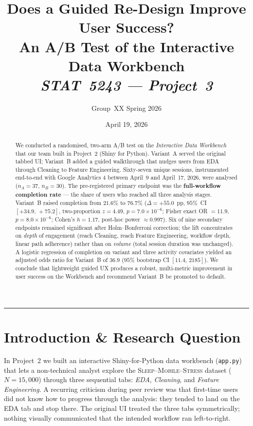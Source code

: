 \documentclass[11pt,a4paper]{article}
\title{\vspace{-1.5em}\textbf{Does a Guided Re-Design Improve User Success?}\\
       \large An A/B Test of the Interactive Data Workbench\\[2pt]
       \normalsize \textit{STAT~5243 — Project~3}}
\author{Group~XX \quad\textbar\quad Spring 2026}
\date{April 19, 2026}
\newcommand{\hr}{\noindent\textcolor{accent!30}{\rule{\linewidth}{0.4pt}}\smallskip}
\begin{document}
\maketitle
\vspace{-2em}

\begin{abstract}\noindent
\small
We conducted a randomised, two-arm A/B test on the
\emph{Interactive Data Workbench} that our team built in Project~2
(Shiny for Python). Variant~A served the original tabbed UI;
Variant~B added a guided walkthrough that nudges users from EDA
through Cleaning to Feature Engineering. Sixty-seven unique
sessions, instrumented end-to-end with Google Analytics 4 between
April~9 and April~17, 2026, were analysed
($n_A=37$, $n_B=30$). The pre-registered primary endpoint was the
\textbf{full-workflow completion rate} — the share of users who
reached all three analysis stages. Variant~B raised completion
from $21.6\%$ to $76.7\%$ ($\Delta = +55.0$~pp,
$95\%$~CI~$[+34.9,\,+75.2]$, two-proportion $z = 4.49$,
$p = 7.0\times10^{-6}$; Fisher exact OR $= 11.9$, $p = 8.0\times10^{-6}$;
Cohen's $h = 1.17$, post-hoc power $\approx 0.997$). Six of nine
secondary endpoints remained significant after Holm--Bonferroni
correction; the lift concentrates on \emph{depth} of engagement
(reach Cleaning, reach Feature Engineering, workflow depth, linear
path adherence) rather than on \emph{volume} (total session
duration was unchanged). A logistic regression of completion on
variant and three activity covariates yielded an adjusted odds
ratio for Variant~B of $36.9$ ($95\%$ bootstrap CI
$[11.4,\,2185]$). We conclude that lightweight guided UX produces a
robust, multi-metric improvement in user success on the Workbench
and recommend Variant~B be promoted to default.
\end{abstract}

\vspace{-0.4em}
\hr

\section{Introduction \& Research Question}

In Project~2 we built an interactive Shiny-for-Python data
workbench (\texttt{app.py}) that lets a non-technical analyst
explore the \textsc{Sleep--Mobile--Stress} dataset
($N=15{,}000$) through three sequential tabs: \textit{EDA},
\textit{Cleaning}, and \textit{Feature Engineering}. A recurring
criticism during peer review was that first-time users did not
know how to progress through the analysis: they tended to land on
the EDA tab and stop there. The original UI treated the three tabs
symmetrically; nothing visually communicated that the intended
workflow ran left-to-right.
\end{document}
